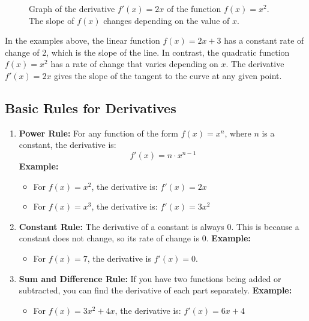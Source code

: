 \begin{figure}[h!]
    \centering
    \caption{Graph of the derivative \( f'(x) = 2x \) of the function \( f(x) = x^2 \). The slope of \( f(x) \) changes depending on the value of \( x \).}
\end{figure}

In the examples above, the linear function \( f(x) = 2x + 3 \) has a constant rate of change of 2, which is the slope of the line. In contrast, the quadratic function \( f(x) = x^2 \) has a rate of change that varies depending on \( x \). The derivative \( f'(x) = 2x \) gives the slope of the tangent to the curve at any given point.


\subsection{Basic Rules for Derivatives}
\begin{enumerate}
    \item \textbf{Power Rule:} For any function of the form \( f(x) = x^n \), where \( n \) is a constant, the derivative is:
    \[
    f'(x) = n \cdot x^{n-1}
    \]
    \textbf{Example:}
    \begin{itemize}
        \item For \( f(x) = x^2 \), the derivative is: \( f'(x) = 2x \)
        \item For \( f(x) = x^3 \), the derivative is: \( f'(x) = 3x^2 \)
    \end{itemize}
    \item \textbf{Constant Rule:} The derivative of a constant is always 0. This is because a constant does not change, so its rate of change is 0.
    \textbf{Example:}
    \begin{itemize}
        \item For \( f(x) = 7 \), the derivative is \( f'(x) = 0 \).
    \end{itemize}
    \item \textbf{Sum and Difference Rule:} If you have two functions being added or subtracted, you can find the derivative of each part separately.
    \textbf{Example:}
    \begin{itemize}
        \item For \( f(x) = 3x^2 + 4x \), the derivative is: \( f'(x) = 6x + 4 \)
    \end{itemize}
\end{enumerate}

